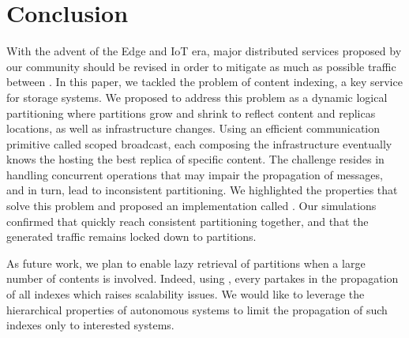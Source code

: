\section{Conclusion}
\label{sec:conclusion}

With the advent of the Edge and IoT era, major distributed services
proposed by our community should be revised in order to mitigate as
much as possible traffic between \processes.  In this paper, we
tackled the problem of content indexing, a key service for storage
systems.
%
We proposed to address this problem as a dynamic logical partitioning
where partitions grow and shrink to reflect content and replicas
locations, as well as infrastructure changes. Using an efficient
communication primitive called scoped broadcast, each \process
composing the infrastructure eventually knows the \process hosting the
best replica of specific content.  The challenge resides in handling
concurrent operations that may impair the propagation of messages, and
in turn, lead to inconsistent partitioning.
%
We highlighted the properties that solve this problem and proposed an
implementation called \NAME.  Our simulations confirmed that
\processes quickly reach consistent partitioning together, and that
the generated traffic remains locked down to partitions.

As future work, we plan to enable lazy retrieval of partitions when a
large number of contents is involved. Indeed, using \NAME, every
\process partakes in the propagation of all indexes which raises
scalability issues. We would like to leverage the hierarchical
properties of
autonomous systems to limit the
propagation of such indexes only to interested systems.

%
%
%

